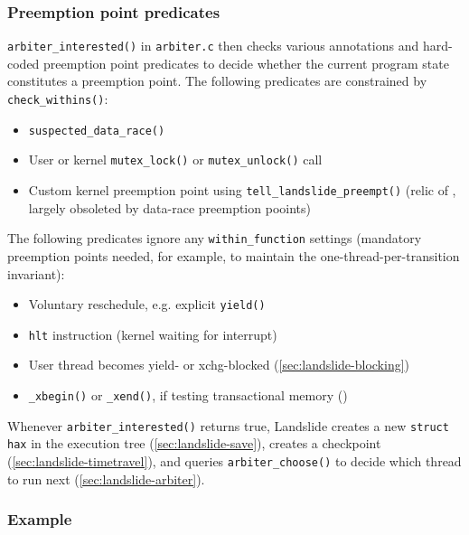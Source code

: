 \subsubsection{Preemption point predicates}

{\tt arbiter\_interested()} in {\tt arbiter.c} then
checks various annotations and hard-coded preemption point predicates
to decide whether the current program state constitutes a preemption point.
The following predicates are constrained by {\tt check\_withins()}:

\begin{itemize}
	\item {\tt suspected\_data\_race()}
	\item User or kernel {\tt mutex\_lock()} or {\tt mutex\_unlock()} call
	\item Custom kernel preemption point using {\tt tell\_landslide\_preempt()}
		(relic of \cite{landslide}, largely obsoleted by data-race preemption pooints)
\end{itemize}

The following predicates ignore any {\tt within\_function} settings
(mandatory preemption points needed, for example, to maintain the one-thread-per-transition invariant):

\begin{itemize}
	\item Voluntary reschedule, e.g. explicit {\tt yield()}
	\item {\tt hlt} instruction (kernel waiting for interrupt)
	\item User thread becomes yield- or xchg-blocked (\cref{sec:landslide-blocking})
	\item {\tt \_xbegin()} or {\tt \_xend()}, if testing transactional memory ()
\end{itemize}

Whenever {\tt arbiter\_interested()} returns true,
Landslide creates a new {\tt struct hax} in the execution tree (\cref{sec:landslide-save}),
creates a checkpoint (\cref{sec:landslide-timetravel}),
and queries {\tt arbiter\_choose()} to decide which thread to run next (\cref{sec:landslide-arbiter}).

\subsubsection{Example}

